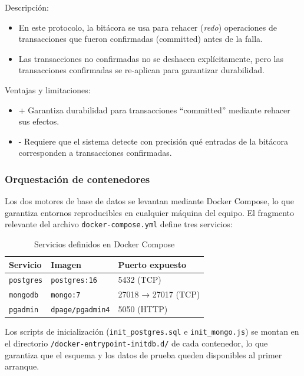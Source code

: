 \documentclass[12pt,letterpaper]{article}
\begin{document}
Descripción:

\begin{itemize}
  \item En este protocolo, la bitácora se usa para rehacer (\emph{redo}) operaciones de transacciones que fueron confirmadas (committed) antes de la falla.
  \item Las transacciones no confirmadas no se deshacen explícitamente, pero las transacciones confirmadas se re-aplican para garantizar durabilidad.
\end{itemize}

Ventajas y limitaciones:
\begin{itemize}
  \item + Garantiza durabilidad para transacciones ``committed'' mediante rehacer sus efectos.
  \item - Requiere que el sistema detecte con precisión qué entradas de la bitácora corresponden a transacciones confirmadas.
\end{itemize}


\subsubsection{Orquestación de contenedores}

Los dos motores de base de datos se levantan mediante Docker Compose, lo que garantiza
entornos reproducibles en cualquier máquina del equipo. El fragmento relevante del archivo
\texttt{docker-compose.yml} define tres servicios:

\begin{table}[H]
  \centering
  \caption{Servicios definidos en Docker Compose}
  \begin{tabularx}{\textwidth}{llX}
    \toprule
    \textbf{Servicio} & \textbf{Imagen} & \textbf{Puerto expuesto} \\
    \midrule
    \texttt{postgres}  & \texttt{postgres:16}  & 5432 (TCP) \\
    \texttt{mongodb}   & \texttt{mongo:7}      & 27018 → 27017 (TCP) \\
    \texttt{pgadmin}   & \texttt{dpage/pgadmin4} & 5050 (HTTP) \\
    \bottomrule
  \end{tabularx}
  \label{tab:docker-services}
\end{table}

Los scripts de inicialización (\texttt{init\_postgres.sql} e \texttt{init\_mongo.js}) se montan
en el directorio \texttt{/docker-entrypoint-initdb.d/} de cada contenedor, lo que garantiza
que el esquema y los datos de prueba queden disponibles al primer arranque.
\end{document}
